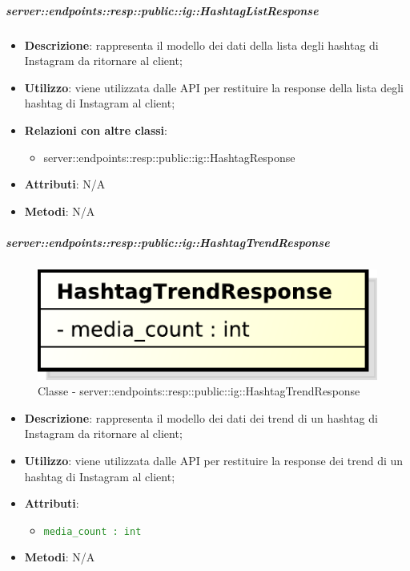     \subparagraph{server::endpoints::resp::public::ig::HashtagListResponse} %
    \label{subp:bdsm_app_server_endpoints_resp_public_ig_hashtaglistresponse}
    \begin{itemize}
      \item \textbf{Descrizione}: rappresenta il modello dei dati della lista degli hashtag di Instagram da ritornare al client;
      \item \textbf{Utilizzo}: viene utilizzata dalle API per restituire la response della lista degli hashtag di Instagram al client;
      \item \textbf{Relazioni con altre classi}:
        \begin{itemize}
          \item server::endpoints::resp::public::ig::HashtagResponse
        \end{itemize}
    \item \textbf{Attributi}: N/A
    \item \textbf{Metodi}: N/A
      \end{itemize}

    \subparagraph{server::endpoints::resp::public::ig::HashtagTrendResponse} %
    \label{subp:bdsm_app_server_endpoints_resp_public_ig_hashtagtrendresponse}
  \begin{figure}[!htbp]
    \centering
    \centerline{\includegraphics[scale=0.6]{./images/server/classes/endpoints/ig/hashtag_trend_response.pdf}}
    \caption{Classe - server::endpoints::resp::public::ig::HashtagTrendResponse}
  \end{figure}
    \begin{itemize}
      \item \textbf{Descrizione}: rappresenta il modello dei dati dei trend di un hashtag di Instagram da ritornare al client;
      \item \textbf{Utilizzo}: viene utilizzata dalle API per restituire la response dei trend di un hashtag di Instagram al client;
    \item \textbf{Attributi}:
      \begin{itemize}
        \item \textcolor{forestgreen}{\texttt{media\_count : int}}
      \end{itemize}
    \item \textbf{Metodi}: N/A
      \end{itemize}

